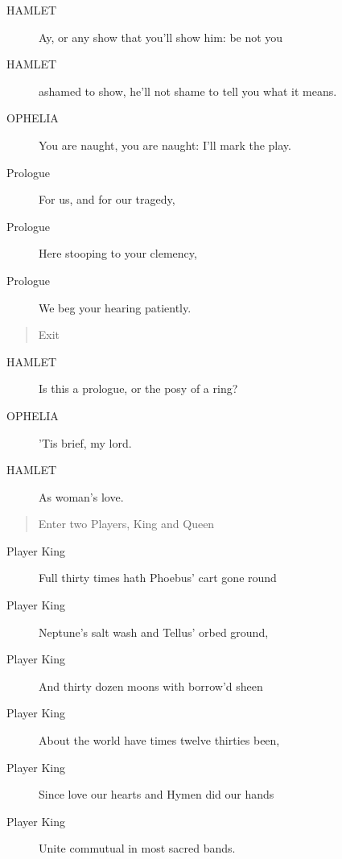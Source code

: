 \documentclass{article}
\begin{document}
\begin{description}
            
\item[HAMLET] Ay, or any show that you'll show him: be not you
\item[HAMLET] ashamed to show, he'll not shame to tell you what it means.
\end{description}
          
\begin{description}
            
\item[OPHELIA] You are naught, you are naught: I'll mark the play.
\end{description}
          
\begin{description}
            
\item[Prologue] For us, and for our tragedy,
\item[Prologue] Here stooping to your clemency,
\item[Prologue] We beg your hearing patiently.
\end{description}
          
\begin{quote}
Exit
\end{quote}
          
\begin{description}
            
\item[HAMLET] Is this a prologue, or the posy of a ring?
\end{description}
          
\begin{description}
            
\item[OPHELIA] 'Tis brief, my lord.
\end{description}
          
\begin{description}
            
\item[HAMLET] As woman's love.
\end{description}
          
\begin{quote}
Enter two Players, King and Queen
\end{quote}
          
\begin{description}
            
\item[Player King] Full thirty times hath Phoebus' cart gone round
\item[Player King] Neptune's salt wash and Tellus' orbed ground,
\item[Player King] And thirty dozen moons with borrow'd sheen
\item[Player King] About the world have times twelve thirties been,
\item[Player King] Since love our hearts and Hymen did our hands
\item[Player King] Unite commutual in most sacred bands.
\end{description}
          
\end{document}
